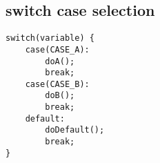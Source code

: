 \subsection{switch case selection}
\begin{lstlisting}
switch(variable) {
    case(CASE_A): 
        doA();
        break;
    case(CASE_B):
        doB();
        break;
    default:
        doDefault();
        break;
}
\end{lstlisting}
